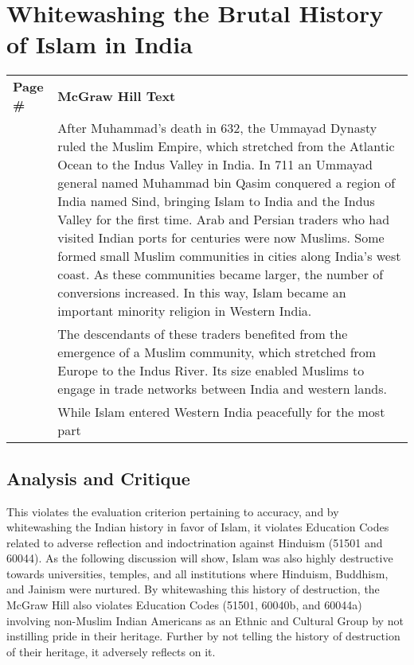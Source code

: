 \chapter{Whitewashing the Brutal History of Islam in India}

\begin{longtable}{|>{\raggedleft}p{1.5cm}|p{8.5cm}|}
\multicolumn{2}{c}{\textbf{Table: 1}}\\ 
\hline
\textbf{Page \#} & \textbf{McGraw Hill Text} \tabularnewline
\hline
166 & After Muhammad’s death in 632, the Ummayad Dynasty ruled the Muslim Empire, which stretched from the Atlantic Ocean to the Indus Valley in India. In 711 an Ummayad general named Muhammad bin Qasim conquered a region of India named Sind, bringing Islam to India and the Indus Valley for the first time. Arab and Persian traders who had visited Indian ports for centuries were now Muslims. Some formed small Muslim communities in cities along India’s west coast. As these communities became larger, the number of conversions increased. In this way, Islam became an important minority religion in Western India. \tabularnewline
\hline
166 & The descendants of these traders benefited from the emergence of a Muslim community, which stretched from Europe to the Indus River. Its size enabled Muslims to engage in trade networks between India and western lands. \tabularnewline
\hline
166 & While Islam entered Western India peacefully for the most part \tabularnewline
\hline
\end{longtable}

\section*{Analysis and Critique} 

This violates the evaluation criterion pertaining to accuracy, and by whitewashing the Indian history in favor of Islam, it violates Education Codes related to adverse reflection and indoctrination against Hinduism (51501 and 60044). As the following discussion will show, Islam was also highly destructive towards universities, temples, and all institutions where Hinduism, Buddhism, and Jainism were nurtured. By whitewashing this history of destruction, the McGraw Hill also violates Education Codes (51501, 60040b, and 60044a) involving non-Muslim Indian Americans as an Ethnic and Cultural Group by not instilling pride in their heritage. Further by not telling the history of destruction of their heritage, it adversely reflects on it. 

